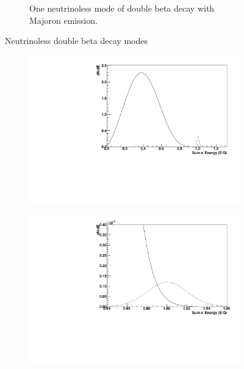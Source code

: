 \documentclass[herrin-thesis.tex]{subfiles}
\begin{document}
\begin{figure}[htp]
\begin{subfigure}[b]{0.48\textwidth}
		\caption[Diagram of \(0\nu\beta\beta\chi^0\)]{One neutrinoless mode of double beta decay with Majoron emission.}
		\label{fig:nu_diagram_0nubbX}
	\end{subfigure}
	\caption[Neutrinoless double beta decay modes]{Neutrinoless double beta decay modes}
	\label{fig:nu_diagrams}
\end{figure}

\begin{figure}[htp]
         \begin{subfigure}[b]{0.48\textwidth}
		\centering
		\includegraphics[width=\textwidth]{./plots/nu_comp_2nu_0nu_1e2.pdf}
	\end{subfigure}\hfill%
         \begin{subfigure}[b]{0.48\textwidth}
		\centering
		\includegraphics[width=\textwidth]{./plots/nu_comp_2nu_0nu_1e6.pdf}

\end{subfigure}
\end{figure}
\end{document}
